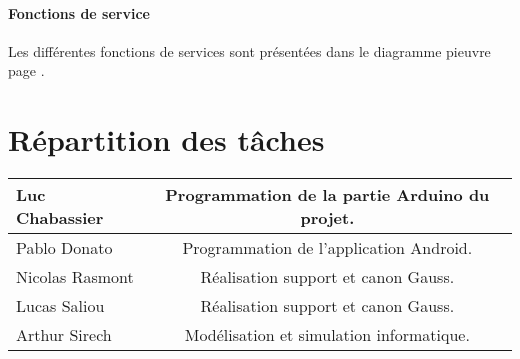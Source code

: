 \documentclass{article}
\begin{document}
\paragraph{Fonctions de service} Les différentes fonctions de services sont présentées dans le diagramme pieuvre page \pageref{pieuvre}.

\section{Répartition des tâches}
\begin{center}
	\begin{tabular}{|l|c|}
		\hline
		Luc Chabassier 	& Programmation de la partie Arduino du projet. \\
		\hline
		Pablo Donato	& Programmation de l'application Android. \\
		\hline
		Nicolas Rasmont	& Réalisation support et canon Gauss. \\
		\hline
		Lucas Saliou	& Réalisation support et canon Gauss. \\
		\hline
		Arthur Sirech	& Modélisation et simulation informatique. \\
		\hline
	\end{tabular}
\end{center}
\end{document}
